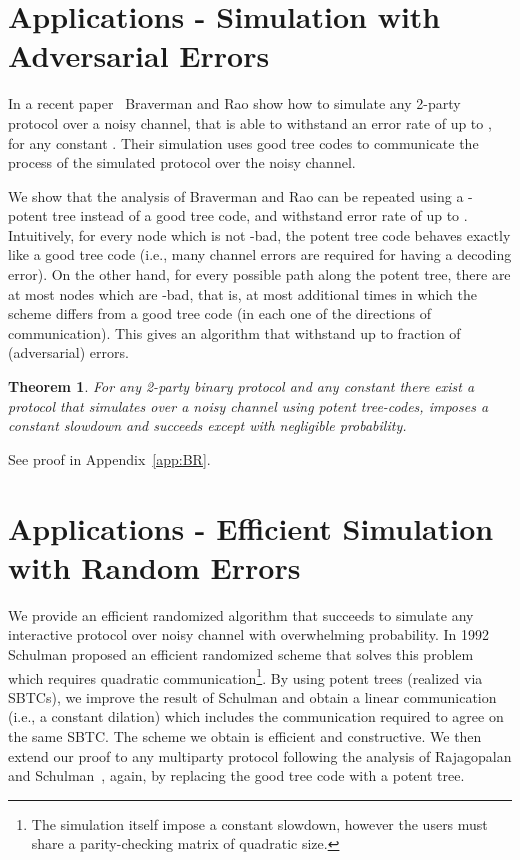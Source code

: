 \documentclass[ letterpaper, 11pt]{article}
\newtheorem{theorem}{Theorem}[section]
\newcommand{\potent}{potent\xspace}
\newcommand{\KTC}{\textsf{SBTC}\xspace}
\begin{document}
\section{Applications - Simulation with Adversarial Errors}\label{sec:appBR}
In a recent paper~\cite{BR10} Braverman and Rao show how to simulate
any 2-party protocol over a noisy channel, that is able to withstand an error
rate of up to , for any constant .
Their simulation uses good tree codes to communicate
the process of the simulated protocol over the noisy channel.

We show that the analysis of Braverman and Rao
can be repeated using a -potent tree instead of a good tree code,
and withstand error rate of up to .
Intuitively, for every node which is not -bad, the potent tree code behaves
exactly like a good tree code (i.e., many channel errors are required for having a decoding error).
On the other hand, for every possible path along the potent tree,
there are at most  nodes which are -bad, that is,
at most additional  times in which the scheme differs from a good tree code (in each one of the directions of communication).
This gives an algorithm that withstand up to 
fraction of (adversarial) errors.

\begin{theorem}\label{thm:BR}
For any 2-party binary protocol  and any constant  there exist a
protocol  that simulates  over a noisy channel using \potent tree-codes,
imposes a constant slowdown
and succeeds except with negligible probability.
\end{theorem}
\noindent See proof in Appendix~\ref{app:BR}.

\section{Applications - Efficient Simulation with   Random Errors }\label{sec:app}



We provide an efficient randomized algorithm that succeeds to simulate
any interactive protocol over noisy channel with overwhelming probability.
In 1992 Schulman proposed an efficient randomized scheme that solves this
problem~\cite{schulman92} which requires quadratic communication\footnote{The simulation itself impose a constant slowdown, however the users must share a parity-checking matrix of quadratic size.}.
By using potent trees (realized via \KTC{}s), we improve the result of Schulman and obtain
a linear communication (i.e., a constant dilation) which includes the communication required to agree on the same \KTC.
The scheme we obtain is efficient and constructive.
We then extend our proof to any multiparty protocol following the analysis of Rajagopalan and Schulman~\cite{RS94}, again, by replacing the good tree code with a potent tree.
\end{document}
